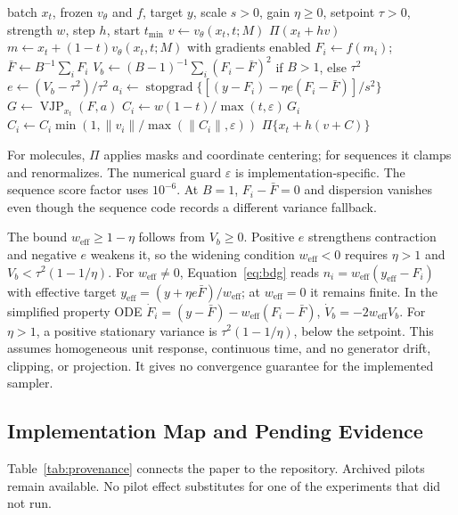 \documentclass{article}
\newcommand{\Fbar}{\bar F}
\newcommand{\Vb}{V_b}
\newcommand{\weff}{w_{\mathrm{eff}}}
\newcommand{\sg}{\operatorname{stopgrad}}
\begin{document}
\begin{algorithm}[htbp]
\caption{One BDG-guided Euler step}\label{alg:bdg}
\begin{algorithmic}[1]
\Require batch $x_t$, frozen $v_\theta$ and $f$, target $y$, scale $s>0$, gain $\eta\ge0$, setpoint $\tau>0$, strength $w$, step $h$, start $t_{\min}$
\State $v\gets v_\theta(x_t,t;M)$
 \State \Return $\Pi(x_t+h v)$ \EndIf
\State $m\gets x_t+(1-t)v_\theta(x_t,t;M)$ with gradients enabled
\State $F_i\gets f(m_i)$; $\Fbar\gets B^{-1}\sum_iF_i$
\State $\Vb\gets (B-1)^{-1}\sum_i(F_i-\Fbar)^2$ if $B>1$, else $\tau^2$
\State $e\gets(\Vb-\tau^2)/\tau^2$ 
\State $a_i\gets\sg\{[(y-F_i)-\eta e(F_i-\Fbar)]/s^2\}$
\State $G\gets\operatorname{VJP}_{x_t}(F,a)$
\State $C_i\gets w(1-t)/\max(t,\varepsilon)\,G_i$
\State $C_i\gets C_i\min(1,\|v_i\|/\max(\|C_i\|,\varepsilon))$
\State \Return $\Pi\{x_t+h(v+C)\}$
\end{algorithmic}
\end{algorithm}

For molecules, $\Pi$ applies masks and coordinate centering; for sequences it clamps and renormalizes. The numerical guard $\varepsilon$ is implementation-specific. The sequence score factor uses $10^{-6}$. At $B=1$, $F_i-\Fbar=0$ and dispersion vanishes even though the sequence code records a different variance fallback.

The bound $\weff\ge1-\eta$ follows from $\Vb\ge0$. Positive $e$ strengthens contraction and negative $e$ weakens it, so the widening condition $\weff<0$ requires $\eta>1$ and $\Vb<\tau^2(1-1/\eta)$. For $\weff\ne0$, Equation~\eqref{eq:bdg} reads $n_i=\weff(y_{\mathrm{eff}}-F_i)$ with effective target $y_{\mathrm{eff}}=(y+\eta e\Fbar)/\weff$; at $\weff=0$ it remains finite. In the simplified property ODE $\dot F_i=(y-\Fbar)-\weff(F_i-\Fbar)$, $\dot V_b=-2\weff V_b$. For $\eta>1$, a positive stationary variance is $\tau^2(1-1/\eta)$, below the setpoint. This assumes homogeneous unit response, continuous time, and no generator drift, clipping, or projection. It gives no convergence guarantee for the implemented sampler.

\clearpage
\subsection{Implementation Map and Pending Evidence}\label{app:implementation}
Table~\ref{tab:provenance} connects the paper to the repository. Archived pilots remain available. No pilot effect substitutes for one of the experiments that did not run.
\end{document}
